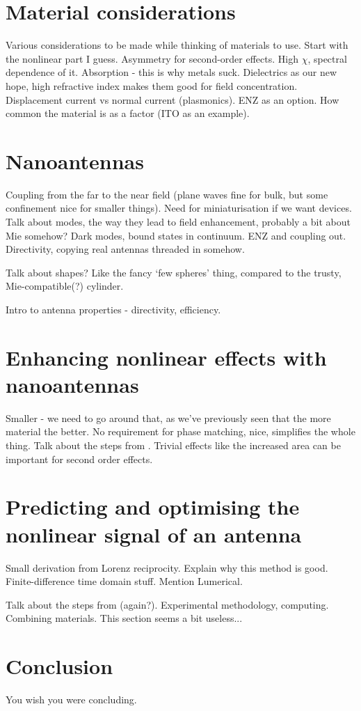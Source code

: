 \documentclass[12pt,a4paper]{article}
\begin{document}
\section{Material considerations}
Various considerations to be made while thinking of materials to use. Start with the nonlinear part I guess. Asymmetry for second-order effects. High $\chi$, spectral dependence of it. Absorption - this is why metals suck. Dielectrics as our new hope, high refractive index makes them good for field concentration. Displacement current vs normal current (plasmonics). ENZ as an option. How common the material is as a factor (ITO as an example).

\section{Nanoantennas}
Coupling from the far to the near field (plane waves fine for bulk, but some confinement nice for smaller things). Need for miniaturisation if we want devices. Talk about modes, the way they lead to field enhancement, probably a bit about Mie somehow? Dark modes, bound states in continuum. ENZ and coupling out. Directivity, copying real antennas threaded in somehow.

Talk about shapes? Like the fancy `few spheres' thing, compared to the trusty, Mie-compatible(?) cylinder.

Intro to antenna properties - directivity, efficiency.

\section{Enhancing nonlinear effects with nanoantennas}
Smaller - we need to go around that, as we've previously seen that the more material the better. No requirement for phase matching, nice, simplifies the whole thing. Talk about the steps from \cite{koshelevSubwavelengthDielectricResonators2020}. Trivial effects like the increased area can be important for second order effects.

\section{Predicting and optimising the nonlinear signal of an antenna}
Small derivation from Lorenz reciprocity. Explain why this method is good. Finite-difference time domain stuff. Mention Lumerical.

Talk about the steps from \cite{koshelevSubwavelengthDielectricResonators2020} (again?). Experimental methodology, computing. Combining materials. This section seems a bit useless...

\section{Conclusion}
You wish you were concluding\cite{aluTheoryModelingFeatures2013}.



\end{document}
